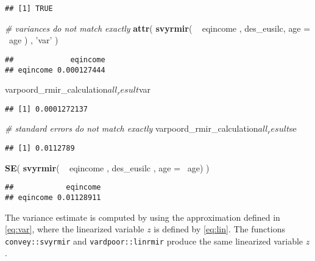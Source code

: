 \documentclass[]{book}
\newenvironment{Shaded}{\begin{snugshade}}{\end{snugshade}}
\newcommand{\KeywordTok}[1]{\textcolor[rgb]{0.13,0.29,0.53}{\textbf{{#1}}}}
\newcommand{\DataTypeTok}[1]{\textcolor[rgb]{0.13,0.29,0.53}{{#1}}}
\newcommand{\StringTok}[1]{\textcolor[rgb]{0.31,0.60,0.02}{{#1}}}
\newcommand{\CommentTok}[1]{\textcolor[rgb]{0.56,0.35,0.01}{\textit{{#1}}}}
\newcommand{\NormalTok}[1]{{#1}}
\begin{document}
\begin{verbatim}
## [1] TRUE
\end{verbatim}

\begin{Shaded}
\begin{Highlighting}[]
\CommentTok{# variances do not match exactly}
\KeywordTok{attr}\NormalTok{( }\KeywordTok{svyrmir}\NormalTok{( ~}\StringTok{ }\NormalTok{eqincome , des_eusilc, }\DataTypeTok{age =} \NormalTok{~age ) , }\StringTok{'var'} \NormalTok{) }
\end{Highlighting}
\end{Shaded}

\begin{verbatim}
##             eqincome
## eqincome 0.000127444
\end{verbatim}

\begin{Shaded}
\begin{Highlighting}[]
\NormalTok{varpoord_rmir_calculation$all_result$var}
\end{Highlighting}
\end{Shaded}

\begin{verbatim}
## [1] 0.0001272137
\end{verbatim}

\begin{Shaded}
\begin{Highlighting}[]
\CommentTok{# standard errors do not match exactly}
\NormalTok{varpoord_rmir_calculation$all_result$se}
\end{Highlighting}
\end{Shaded}

\begin{verbatim}
## [1] 0.0112789
\end{verbatim}

\begin{Shaded}
\begin{Highlighting}[]
\KeywordTok{SE}\NormalTok{( }\KeywordTok{svyrmir}\NormalTok{( ~}\StringTok{ }\NormalTok{eqincome , des_eusilc , }\DataTypeTok{age =} \NormalTok{~age) ) }
\end{Highlighting}
\end{Shaded}

\begin{verbatim}
##            eqincome
## eqincome 0.01128911
\end{verbatim}

The variance estimate is computed by using the approximation defined in
\eqref{eq:var}, where the linearized variable \(z\) is defined by
\eqref{eq:lin}. The functions \texttt{convey::svyrmir} and
\texttt{vardpoor::linrmir} produce the same linearized variable \(z\).
\end{document}
